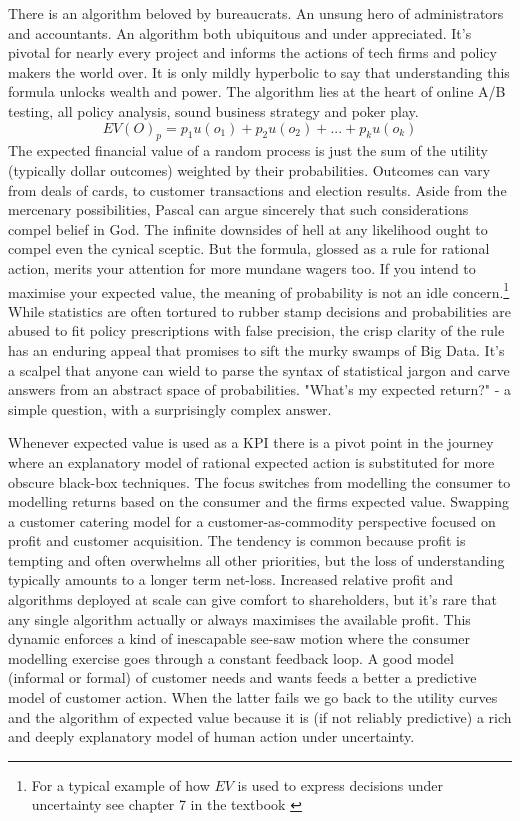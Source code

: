 \documentclass{tufte-handout}
\begin{document}
There is an algorithm beloved by bureaucrats. An unsung hero of administrators and accountants. An algorithm both ubiquitous and under appreciated. It's pivotal for nearly every project and informs the actions of tech firms and policy makers the world over. It is only mildly hyperbolic to say that understanding this formula unlocks wealth and power. The algorithm lies at the heart of online A/B testing, all policy analysis, sound business strategy and poker play. 
$$ EV(O)_{p} = p_{1}u(o_{1}) + p_{2}u(o_{2}) + ... + p_{k}u(o_{k}) $$
The expected financial value of a random process is just the sum of the utility (typically dollar outcomes) weighted by their probabilities. 
Outcomes can vary from deals of cards, to customer transactions and election results. Aside from the mercenary possibilities, Pascal can argue sincerely that such considerations compel belief in God. The infinite downsides of hell at any likelihood ought to compel even the cynical sceptic.  But the formula, glossed as a rule for rational action, merits your attention for more mundane wagers too. If you intend to maximise your expected value, the meaning of probability is not an idle concern.\footnote{For a typical example of how $EV$ is used to express decisions under uncertainty see chapter 7 in the textbook \cite{BarberBR_ML}} While statistics are often tortured to rubber stamp decisions and probabilities are abused to fit policy prescriptions with false precision, the crisp clarity of the rule has an enduring appeal that promises to sift the murky swamps of Big Data. It's a scalpel that anyone can wield to parse the syntax of statistical jargon and carve answers from an abstract space of probabilities. "What's my expected return?" - a simple question, with a surprisingly complex answer. 
\linebreak

\noindent Whenever expected value is used as a KPI there is a pivot point in the journey where an explanatory model of rational expected action is substituted for more obscure black-box techniques. The focus switches from modelling the consumer to modelling returns based on the consumer and the firms expected value. Swapping a customer catering model for a customer-as-commodity perspective focused on profit and customer acquisition. The tendency is common because profit is tempting and often overwhelms all other priorities, but the loss of understanding typically amounts to a longer term net-loss. Increased relative profit and algorithms deployed at scale can give comfort to shareholders, but it's rare that any single algorithm actually or always maximises the available profit. This dynamic enforces a kind of inescapable see-saw motion where the consumer modelling exercise goes through a constant feedback loop. A good model (informal or formal) of customer needs and wants feeds a better a predictive model of customer action. When the latter fails we go back to the utility curves and the algorithm of expected value because it is (if not reliably predictive) a rich and deeply explanatory model of human action under uncertainty. 
\end{document}
